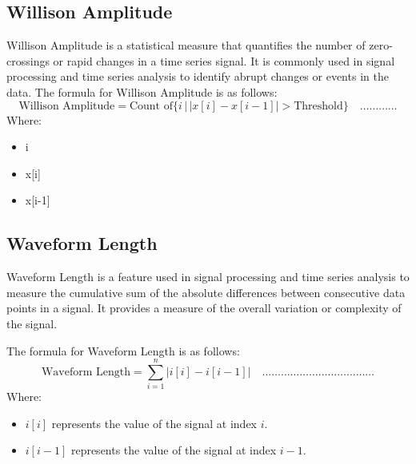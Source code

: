 \subsection{Willison Amplitude}
Willison Amplitude is a statistical measure that quantifies the number of zero-crossings or rapid changes in a time series signal. It is commonly used in signal processing and time series analysis to identify abrupt changes or events in the data.
The formula for Willison Amplitude is as follows:
\begin{equation}
\label{eq: Willison Amplitude}
\text{Willison Amplitude} = \text{Count of} \{i \, | \, |x[i] - x[i-1]| > \text{Threshold}\} \quad  \dots \dots \dots \dots  
\end{equation}
Where:
\begin{itemize}
    
\item i   
\item x[i]   
\item x[i-1]   

\end{itemize}

\subsection{Waveform Length}
Waveform Length is a feature used in signal processing and time series analysis to measure the cumulative sum of the absolute differences between consecutive data points in a signal. It provides a measure of the overall variation or complexity of the signal.
\par
The formula for Waveform Length is as follows:
\begin{equation}
\label{eq: Waveform Length}
\text{Waveform Length} = \sum_{i=1}^{n} |i[i] - i[i-1]| \quad  \dots \dots \dots \dots \dots \dots \dots \dots \dots \dots \dots \dots
\end{equation}
Where:
\begin{itemize}
    \item $i[i]$ represents the value of the signal at index $i$.
    \item $i[i-1]$ represents the value of the signal at index $i-1$.
\end{itemize}

